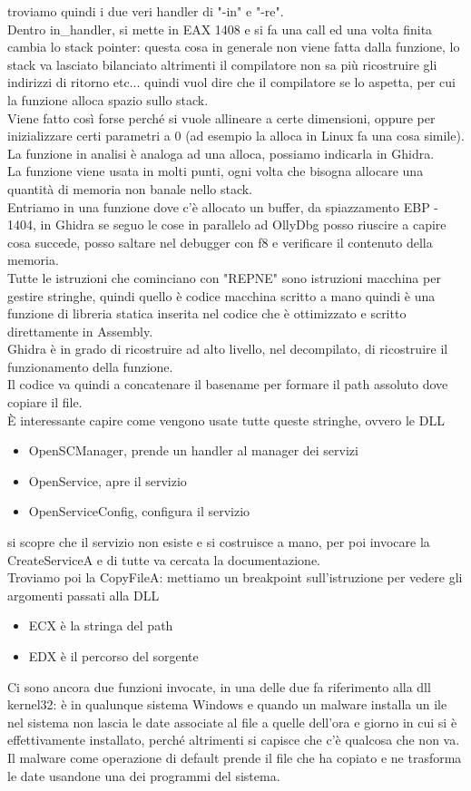 \documentclass[12pt, oneside]{extbook}
\begin{document}
troviamo quindi i due veri handler di "-in" e "-re".\\Dentro in\_handler, si mette in EAX 1408 e si fa una call ed una volta finita cambia lo stack pointer: questa cosa in generale non viene fatta dalla funzione, lo stack va lasciato bilanciato altrimenti il compilatore non sa più ricostruire gli indirizzi di ritorno etc... quindi vuol dire che il compilatore se lo aspetta, per cui la funzione alloca spazio sullo stack.\\Viene fatto così forse perché si vuole allineare a certe dimensioni, oppure per inizializzare certi parametri a 0 (ad esempio la \textsf{alloca} in Linux fa una cosa simile).\\La funzione in analisi è analoga ad una \textsf{alloca}, possiamo indicarla in Ghidra.\\La funzione viene usata in molti punti, ogni volta che bisogna allocare una quantità di memoria non banale nello stack.\\Entriamo in una funzione dove c'è allocato un buffer, da spiazzamento EBP - 1404, in Ghidra se seguo le cose in parallelo ad OllyDbg posso riuscire a capire cosa succede, posso saltare nel debugger con f8 e verificare il contenuto della memoria.\\Tutte le istruzioni che cominciano con "REPNE" sono istruzioni macchina per gestire stringhe, quindi quello è codice macchina scritto a mano quindi è una funzione di libreria statica inserita nel codice che è ottimizzato e scritto direttamente in Assembly.\\Ghidra è in grado di ricostruire ad alto livello, nel decompilato, di ricostruire il funzionamento della funzione.\\Il codice va quindi a concatenare il basename per formare il path assoluto dove copiare il file.\\È interessante capire come vengono usate tutte queste stringhe, ovvero le DLL
\begin{itemize}
\item OpenSCManager, prende un handler al manager dei servizi
\item OpenService, apre il servizio
\item OpenServiceConfig, configura il servizio
\end{itemize}
si scopre che il servizio non esiste e si costruisce a mano, per poi invocare la CreateServiceA e di tutte va cercata la documentazione.\\Troviamo poi la CopyFileA: mettiamo un breakpoint sull'istruzione per vedere gli argomenti passati alla DLL
\begin{itemize}
\item ECX è la stringa del path
\item EDX è il percorso del sorgente
\end{itemize}
Ci sono ancora due funzioni invocate, in una delle due fa riferimento alla dll kernel32: è in qualunque sistema Windows e quando un malware installa un ile nel sistema non lascia le date associate al file a quelle dell'ora e giorno in cui si è effettivamente installato, perché altrimenti si capisce che c'è qualcosa che non va. Il malware come operazione di default prende il file che ha copiato e ne trasforma le date usandone una dei programmi del sistema.
\end{document}

